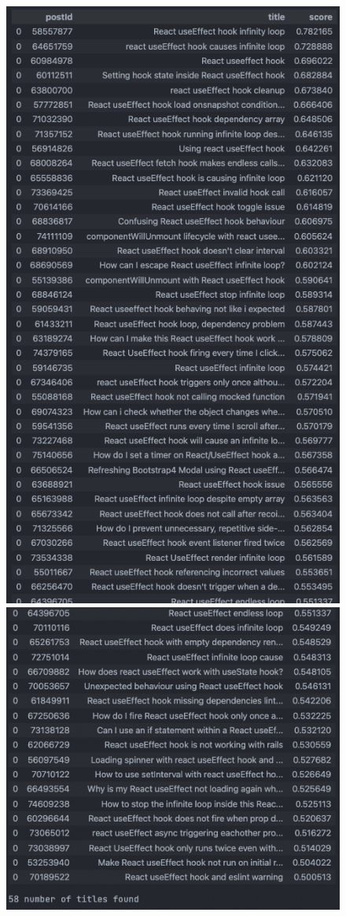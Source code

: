 \begin{figure}[H]
  \noindent \includegraphics[scale=0.45]{assets/spacy-query-1-results.png}
  \noindent \includegraphics[scale=0.45]{assets/spacy-query-1-results-1.png}

\end{figure}

